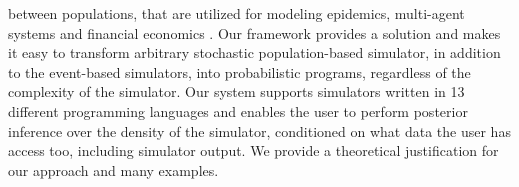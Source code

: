 \documentclass{article}
\begin{document}
between populations, that are utilized for modeling epidemics, multi-agent systems and financial economics \cite{raberto2001agent,landau_binder_2014,hartig2011statistical,smith2008towards,bershteyn2018implementation}. 
Our framework provides a solution and makes it easy to transform arbitrary stochastic population-based simulator, in addition to the event-based simulators, into probabilistic programs, regardless of the complexity of the simulator. 
Our system supports simulators written in 13 different programming languages and enables the user to perform posterior inference over the density of the simulator, conditioned on what data the user has access too, including 
simulator output. 
We provide a theoretical justification for our approach and many examples.





\end{document}
